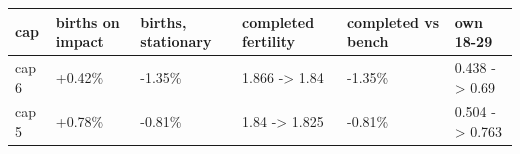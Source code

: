 \begingroup\small
\setlength{\tabcolsep}{3pt}
\renewcommand{\arraystretch}{1.04}
\begin{tabularx}{\linewidth}{XXXXXX}
\toprule
cap & births on impact & births, stationary & completed fertility & completed vs bench & own 18-29 \\
\midrule
cap 6 & +0.42\% & -1.35\% & 1.866 -\textgreater{} 1.84 & -1.35\% & 0.438 -\textgreater{} 0.69 \\
cap 5 & +0.78\% & -0.81\% & 1.84 -\textgreater{} 1.825 & -0.81\% & 0.504 -\textgreater{} 0.763 \\
\bottomrule
\end{tabularx}
\endgroup
